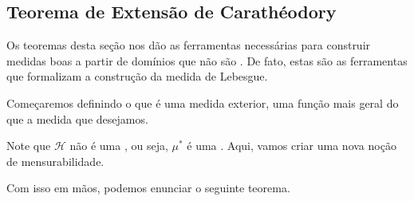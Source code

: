 \measureCompletion
\subsection{Teorema de Extensão de Carathéodory}
Os teoremas desta seção nos dão as ferramentas necessárias para construir medidas boas a partir de domínios que não são \sigmaAlgs. De fato, estas são as ferramentas que formalizam a construção da medida de Lebesgue.

Começaremos definindo o que é uma medida exterior, uma função mais geral do que a medida que desejamos.

\outerMeasure

Note que $\mathcal{H}$ não é uma \sigmaAlg, ou seja, $\mu^{*}$ é uma . Aqui, vamos criar uma nova noção de mensurabilidade.

\measurableInOuterMeasure

Com isso em mãos, podemos enunciar o seguinte teorema.

\caratheodory














